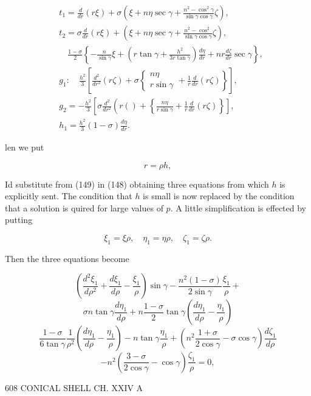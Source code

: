 \[\begin{aligned}
& t_1=\frac{d}{d r}(r \xi)+\sigma\left(\xi+n \eta \sec \gamma+\frac{n^2-\cos ^2 \gamma}{\sin \gamma \cos \gamma} \zeta\right), \\
& t_2=\sigma \frac{d}{d r}(r \xi)+\left(\xi+n \eta \sec \gamma+\frac{n^2-\cos ^2}{\sin \gamma \cos \gamma} \zeta\right), \\
& \quad \frac{1-\sigma}{2}\left\{-\frac{n}{\sin \gamma} \xi+\left(r \tan \gamma+\frac{h^2}{3 r \tan \gamma}\right) \frac{d \eta}{d r}+n r \frac{d \zeta}{d r} \sec \gamma\right\}, \\
& g_1: \quad \frac{h^2}{3}\left[\frac{d^2}{d r^2}(r \zeta)+\sigma\left\{\begin{array}{c}
n \eta \\
r \sin \gamma
\end{array}+\frac{1}{r} \frac{d}{d r}(r \zeta)\right\}\right], \\
& g_2=-\frac{h^2}{3}\left[\sigma \frac{d^2}{d r^2}\left(r()+\left\{\frac{n \eta}{r \sin \gamma}+\frac{1}{r} \frac{d}{d r}(r \zeta)\right\}\right],\right. \\
& h_1=\frac{h^2}{3}(1-\sigma) \frac{d \eta}{d r} .
\end{aligned}\]

len we put

\[r=\rho h,\]

Id substitute from (149) in (148) obtaining three equations from which
\(h\) is explicitly sent. The condition that \(h\) is small is now
replaced by the condition that a solution is quired for large values of
\(p\). A little simplification is effected by putting

\[\xi_1=\xi \rho, \quad \eta_1=\eta \rho, \quad \zeta_1=\zeta \rho .\]

Then the three equations become

\[
\left(\frac{d^2 \xi_1}{d \rho^2}+\frac{d \xi_1}{d \rho}-\frac{\xi_1}{\rho}\right) \sin \gamma-\frac{n^2(1-\sigma)}{2 \sin \gamma} \frac{\xi_1}{\rho}+
\]
\[
\sigma n \tan \gamma \frac{d \eta_1}{d \rho}+n \frac{1-\sigma}{2} \tan \gamma\left(\frac{d \eta_1}{d \rho}-\frac{\eta_1}{\rho}\right)
\]
\[
\frac{1-\sigma}{6 \tan \gamma} \frac{1}{\rho^2}\left(\frac{d \eta_1}{d \rho}-\frac{\eta_1}{\rho}\right)-n \tan \gamma \frac{\eta_1}{\rho}+\left(n^2 \frac{1+\sigma}{2 \cos \gamma}-\sigma \cos \gamma\right) \frac{d \zeta_1}{d \rho}
\]
\[
-n^2\left(\frac{3-\sigma}{2 \cos \gamma}-\cos \gamma\right) \frac{\zeta_1}{\rho}=0,
\]

608 CONICAL SHELL CH. XXIV A

